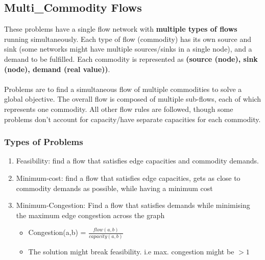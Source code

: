 \subsection{Multi\_Commodity Flows}
These problems have a single flow network with \textbf{multiple types of flows} running simultaneously. Each type of flow (commodity) has its own source and sink (some networks might have multiple sources/sinks in a single node), and a demand to be fulfilled. Each commodity is represented as \textbf{(source (node), sink (node), demand (real value))}.\\ \\
Problems are to find a simultaneous flow of multiple commodities to solve a global objective. The overall flow is composed of multiple sub-flows, each of which represents one commodity. All other flow rules are followed, though some problems don't account for capacity/have separate capacities for each commodity.

\subsubsection{Types of Problems}\label{subsubsec:Multi_Commodity_Problem_Types}
\begin{enumerate}
    \item Feasibility: find a flow that satisfies edge capacities and commodity demands.
    \item Minimum-cost: find a flow that satisfies edge capacities, gets as close to commodity demands as possible, while having a minimum cost
    \item Minimum-Congestion: Find a flow that satisfies demands while minimising the maximum edge congestion across the graph
    \begin{itemize}
        \item Congestion(a,b) = $\frac{flow(a,b)}{capacity(a,b)}$
        \item The solution might break feasibility. i.e max. congestion might be $>1$
    \end{itemize}
\end{enumerate}

